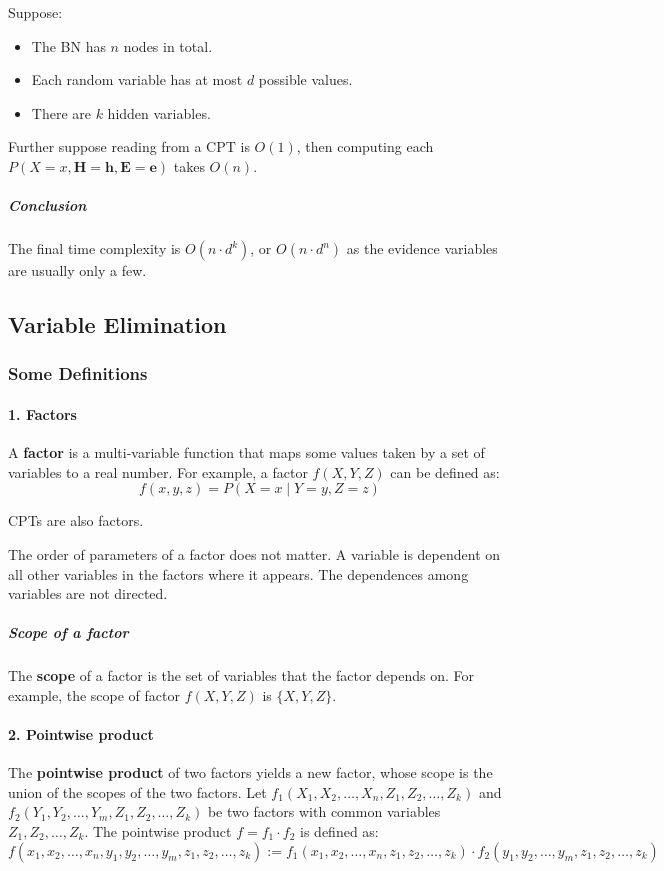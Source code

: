 \documentclass[10pt,UTF8]{article}
\theoremstyle{definition}
\newtheorem{definition inner}{Definition}[section]
\theoremstyle{definition}
\newtheorem{theorem inner}{Theorem}[section]
\theoremstyle{definition}
\newtheorem*{proof inner}{\textit{Proof}}
\theoremstyle{plain}
\newtheorem{tip inner}{Tip}[section]
\theoremstyle{remark}
\begin{document}
Suppose:
\begin{itemize}
  \item The BN has \(n\) nodes in total.
  \item Each random variable has at most \(d\) possible values.
  \item There are \(k\) hidden variables.
\end{itemize}

Further suppose reading from a CPT is \(O(1)\),
then computing each \(P(X=x, \bm{H}=\bm{h}, \bm{E}=\bm{e})\) takes \(O(n)\).

\subparagraph*{Conclusion}
The final time complexity is
\(O(n\cdot d^k)\),
or \(O(n\cdot d^n)\) as the evidence variables are usually only a few.

\subsection{Variable Elimination}

\subsubsection{Some Definitions}

\paragraph*{1. Factors}
A \textbf{factor} is a multi-variable function that maps some values taken
by a set of variables to a real number.
For example, a factor \(f(X, Y, Z)\) can be defined as:
\[
  f(x, y, z) = P(X=x \mid Y=y, Z=z)
\]

CPTs are also factors.

The order of parameters of a factor does not matter.
A variable is dependent on all other variables in the factors where it appears.
The dependences among variables are not directed.

\subparagraph*{Scope of a factor}
The \textbf{scope} of a factor is the set of variables that the
factor depends on.
For example, the scope of factor \(f(X, Y, Z)\) is \( \{X, Y, Z\} \).

\paragraph*{2. Pointwise product}
The \textbf{pointwise product} of two factors yields a new factor,
whose scope is the union of the scopes of the two factors.
Let \(f_1(X_1, X_2, \ldots, X_n, Z_1, Z_2, \ldots, Z_k)\) and
\(f_2(Y_1, Y_2, \ldots, Y_m, Z_1, Z_2, \ldots, Z_k)\) be two factors
with common variables \(Z_1, Z_2, \ldots, Z_k\).
The pointwise product \(f = f_1 \cdot f_2\) is defined as:
\[
  f(x_1, x_2, \ldots, x_n, y_1, y_2, \ldots, y_m, z_1, z_2, \ldots, z_k)
  := f_1(x_1, x_2, \ldots, x_n, z_1, z_2, \ldots, z_k) \cdot
  f_2(y_1, y_2, \ldots, y_m, z_1, z_2, \ldots, z_k)
\]
\end{document}
